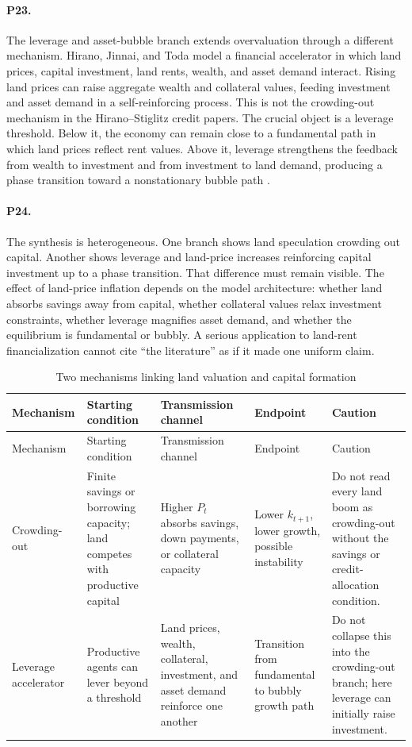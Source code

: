 \documentclass[11pt]{article}
\begin{document}
\paragraph{P23.} The leverage and asset-bubble branch extends overvaluation through a different mechanism. Hirano, Jinnai, and Toda model a financial accelerator in which land prices, capital investment, land rents, wealth, and asset demand interact. Rising land prices can raise aggregate wealth and collateral values, feeding investment and asset demand in a self-reinforcing process. This is not the crowding-out mechanism in the Hirano--Stiglitz credit papers. The crucial object is a leverage threshold. Below it, the economy can remain close to a fundamental path in which land prices reflect rent values. Above it, leverage strengthens the feedback from wealth to investment and from investment to land demand, producing a phase transition toward a nonstationary bubble path \citep[pp.~2--3, 9]{hiranoJinnaiToda2024Leverage}.

\paragraph{P24.} The synthesis is heterogeneous. One branch shows land speculation crowding out capital. Another shows leverage and land-price increases reinforcing capital investment up to a phase transition. That difference must remain visible. The effect of land-price inflation depends on the model architecture: whether land absorbs savings away from capital, whether collateral values relax investment constraints, whether leverage magnifies asset demand, and whether the equilibrium is fundamental or bubbly. A serious application to land-rent financialization cannot cite ``the literature'' as if it made one uniform claim.

\begin{center}
\small
\begin{longtable}{p{}p{}p{}p{}p{}}
\caption{Two mechanisms linking land valuation and capital formation}\label{tab:mechanisms-land-capital}\\
\toprule
Mechanism & Starting condition & Transmission channel & Endpoint & Caution\\
\midrule
\endfirsthead
\toprule
Mechanism & Starting condition & Transmission channel & Endpoint & Caution\\
\midrule
\endhead
Crowding-out & Finite savings or borrowing capacity; land competes with productive capital & Higher \(P_t\) absorbs savings, down payments, or collateral capacity & Lower \(k_{t+1}\), lower growth, possible instability & Do not read every land boom as crowding-out without the savings or credit-allocation condition.\\
Leverage accelerator & Productive agents can lever beyond a threshold & Land prices, wealth, collateral, investment, and asset demand reinforce one another & Transition from fundamental to bubbly growth path & Do not collapse this into the crowding-out branch; here leverage can initially raise investment.\\
\bottomrule
\end{longtable}
\end{center}
\end{document}
